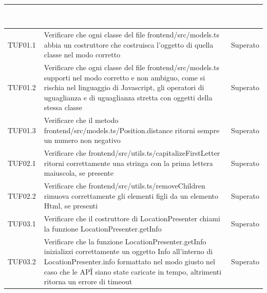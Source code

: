     {
        \setlength{\freewidth}{\dimexpr\textwidth-10\tabcolsep}
        \renewcommand{\arraystretch}{1.5}
        \centering
        \setlength{\aboverulesep}{0pt}
        \setlength{\belowrulesep}{0pt}
        \begin{longtable}{C{.3\freewidth} C{.5\freewidth} C{.3\freewidth}}
        \toprule
        \textcolor{white}{\textbf{Codice Test}}&
        \textcolor{white}{\textbf{Descrizione}}&
        \textcolor{white}{\textbf{Stato}}\\	
        \toprule
        \endhead

        TUF01.1 & Verificare che ogni classe del file frontend/src/models.ts
                abbia un costruttore che costruisca l'oggetto di quella classe nel modo corretto & Superato \\

        TUF01.2 & Verificare che ogni classe del file frontend/src/models.ts
                supporti nel modo corretto e non ambiguo, come si rischia nel linguaggio di Javascript,
                gli operatori di uguaglianza e di uguaglianza stretta con oggetti della stessa classe & Superato \\

        TUF01.3 & Verificare che il metodo frontend/src/models.ts/Position.distance
                ritorni sempre un numero non negativo & Superato \\

        TUF02.1 & Verificare che frontend/src/utils.ts/capitalizeFirstLetter
                ritorni correttamente una stringa con la prima lettera maiuscola, se presente & Superato \\

        TUF02.2 & Verificare che frontend/src/utils.ts/removeChildren
                rimuova correttamente gli elementi figli da un elemento Html, se presenti & Superato \\

        TUF03.1 & Verificare che il costruttore di LocationPresenter chiami la funzione LocationPresenter.getInfo & Superato \\

        TUF03.2 & Verificare che la funzione LocationPresenter.getInfo inizializzi correttamente un oggetto Info all'interno di LocationPresenter.info 
                formattato nel modo giusto nel caso che le API\G{} siano state caricate in tempo, altrimenti ritorna un errore di timeout & Superato \\


\end{longtable}}
